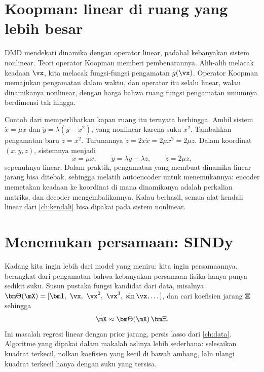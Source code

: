 \section{Koopman: linear di ruang yang lebih besar}

DMD mendekati dinamika dengan operator linear, padahal kebanyakan sistem nonlinear. Teori operator
Koopman \citep{koopman1931} memberi pembenarannya. Alih-alih melacak keadaan $\vx$, kita melacak fungsi-fungsi
pengamatan $g(\vx)$. Operator Koopman memajukan pengamatan dalam waktu, dan operator itu selalu linear,
walau dinamikanya nonlinear, dengan harga bahwa ruang fungsi pengamatan umumnya berdimensi tak hingga.

Contoh dari \citet{brunton2022} memperlihatkan kapan ruang itu ternyata berhingga. Ambil sistem
$\dot x=\mu x$ dan $\dot y=\lambda(y-x^2)$, yang nonlinear karena suku $x^2$. Tambahkan pengamatan baru
$z=x^2$. Turunannya $\dot z=2x\dot x=2\mu x^2=2\mu z$. Dalam koordinat $(x,y,z)$, sistemnya menjadi
\begin{equation}
\dot x=\mu x,\qquad \dot y=\lambda y-\lambda z,\qquad \dot z=2\mu z,
\end{equation}
sepenuhnya linear. Dalam praktik, pengamatan yang membuat dinamika linear jarang bisa ditebak, sehingga
\citet{lusch2018} melatih autoencoder untuk menemukannya: encoder memetakan keadaan ke koordinat di mana
dinamikanya adalah perkalian matriks, dan decoder mengembalikannya. Kalau berhasil, semua alat kendali
linear dari \cref{ch:kendali} bisa dipakai pada sistem nonlinear.

\section{Menemukan persamaan: SINDy}

Kadang kita ingin lebih dari model yang meniru: kita ingin persamaannya.  \citep{brunton2016} berangkat dari pengamatan bahwa kebanyakan persamaan fisika
hanya punya sedikit suku. Susun pustaka fungsi kandidat dari data, misalnya
$\bm\Theta(\mX)=[\bm1,\ \vx,\ \vx^2,\ \vx^3,\ \sin\vx,\dots]$, dan cari koefisien jarang $\bm\Xi$ sehingga
\begin{equation}
\dot{\mX}\approx\bm\Theta(\mX)\,\bm\Xi.
\end{equation}
Ini masalah regresi linear dengan prior jarang, persis lasso dari \cref{ch:data}. Algoritme yang dipakai
dalam makalah aslinya lebih sederhana: selesaikan kuadrat terkecil, nolkan koefisien yang kecil di bawah
ambang, lalu ulangi kuadrat terkecil hanya dengan suku yang tersisa.

